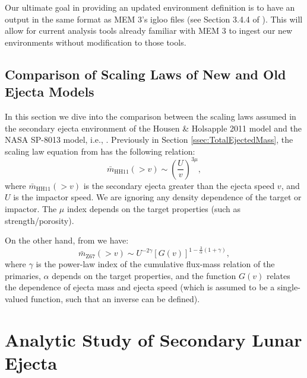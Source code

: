 \documentclass{hitec}
\numberwithin{equation}{section}
\begin{document}
Our ultimate goal in providing an updated environment definition is to have an output in the same format as MEM 3's igloo files (see Section 3.4.4 of \cite{moorhead2019nasa}). This will allow for current analysis tools already familiar with MEM 3 to ingest our new environments without modification to those tools. 


\subsection{Comparison of Scaling Laws of New and Old Ejecta Models}

In this section we dive into the comparison between the scaling laws assumed in the secondary ejecta environment of the Housen \& Holsapple 2011 model and the NASA SP-8013 model, i.e., \cite{zook1967problem}. Previously in Section \ref{ssec:TotalEjectedMass}, the scaling law equation from \cite{housen2011ejecta} has the following relation:
\begin{equation}
\bar{m}_{\text{HH11}}(>v) \sim \left(\frac{U}{v}\right)^{3\mu},
\end{equation}
where $\bar{m}_{\text{HH11}}(>v)$ is the secondary ejecta greater than the ejecta speed $v$, and $U$ is the impactor speed. We are ignoring any density dependence of the target or impactor. The $\mu$ index depends on the target properties (such as strength/porosity).

On the other hand, from \cite{zook1967problem} we have:
\begin{equation}
\bar{m}_{\text{Z67}}(>v) \sim U^{-2\gamma}\left[G(v)\right]^{1-\frac{3}{\alpha}(1+\gamma)},
\end{equation}
where $\gamma$ is the power-law index of the cumulative flux-mass relation of the primaries, $\alpha$ depends on the target properties, and the function $G(v)$ \citep[from Figure 10 of][]{gault1963spray} relates the dependence of ejecta mass and ejecta speed (which is assumed to be a single-valued function, such that an inverse can be defined).



\section{Analytic Study of Secondary Lunar Ejecta}
\label{sec:AnalyticStudyofSecondaryLunarEjecta}
\end{document}
